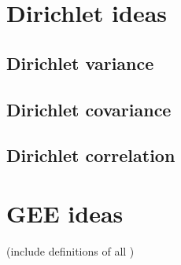 \documentclass[10pt]{article}
\theoremstyle{definition}
\begin{document}
\section{Dirichlet ideas }

\subsection{Dirichlet variance }

\subsection{Dirichlet covariance }

\subsection{Dirichlet correlation }

\section{GEE ideas}

(include definitions of all )
\end{document}
